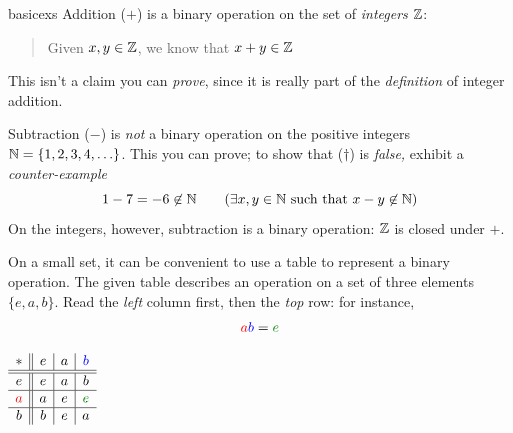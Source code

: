 \begin{examples}{}{basicexs}
	\exstart Addition ($+$) is a binary operation on the set of \emph{integers} $\mathbb{Z}$:\vspace{-2pt}
	\begin{enumerate}\setcounter{enumi}{1}\itemsep2pt
		\item[]\begin{quote}
			Given $x,y\in\mathbb{Z}$, we know that $x+y\in\mathbb{Z}$
		\end{quote}
		\smallskip
		This isn't a claim you can \emph{prove}, since it is really part of the \emph{definition} of integer addition.

	  \item Subtraction ($-$) is \emph{not} a binary operation on the positive integers $\mathbb{N}=\{1,2,3,4,\ldots\}$. This you can prove; to show that ($\dag$) is \emph{false,} exhibit a \emph{counter-example}
	  \[
	  	1-7=-6\not\in\N\tag{$\exists x,y\in\N$ such that $x-y\not\in\N$}
	  \]
	  On the integers, however, subtraction is a binary operation: $\mathbb{Z}$ is closed under $+$.
  
  
	 	\begin{minipage}[t]{0.79\linewidth}\vspace{0pt}
		  \item\label{ex:table1} On a small set, it can be convenient to use a table to represent a binary operation. The given table describes an operation on a set of three elements $\{e,a,b\}$. Read the  \emph{left} column first, then the \emph{top} row: for instance,
		  \[
		  	\textcolor{red}{a}\textcolor{blue}{b}=\textcolor{Green}{e}
		  \]
		\end{minipage}
		\hfill
		\begin{minipage}[t]{0.2\linewidth}\vspace{0pt}
			\flushright
			$\begin{array}{c||c|c|c}
				* & e & a & \textcolor{blue}{b}\\\hline\hline
				e & e & a & b\\\hline
				\textcolor{red}{a} & a & e & \textcolor{Green}{e}\\\hline
				b & b & e & a
			\end{array}$
		\end{minipage}
	\end{enumerate}
\end{examples}

